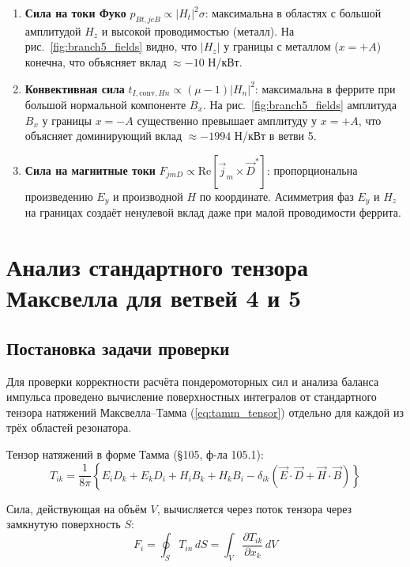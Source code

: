 \documentclass[a4paper,12pt]{article}
\begin{document}
\begin{enumerate}
    \item \textbf{Сила на токи Фуко} $p_{Bt,jeB} \propto |H_t|^2 \sigma$:
    максимальна в областях с большой амплитудой $H_z$ и высокой проводимостью
    (металл). На рис.~\ref{fig:branch5_fields} видно, что $|H_z|$ у границы
    с металлом ($x = +A$) конечна, что объясняет вклад $\approx -10$ Н/кВт.

    \item \textbf{Конвективная сила} $t_{I,\text{conv},Hn} \propto (\mu-1) |H_n|^2$:
    максимальна в феррите при большой нормальной компоненте $B_x$. На
    рис.~\ref{fig:branch5_fields} амплитуда $B_x$ у границы $x = -A$
    существенно превышает амплитуду у $x = +A$, что объясняет доминирующий
    вклад $\approx -1994$ Н/кВт в ветви 5.

    \item \textbf{Сила на магнитные токи} $F_{jmD} \propto \text{Re}[\vec{j}_m \times \vec{D}^*]$:
    пропорциональна произведению $E_y$ и производной $H$ по координате.
    Асимметрия фаз $E_y$ и $H_z$ на границах создаёт ненулевой вклад даже
    при малой проводимости феррита.
\end{enumerate}




\section{Анализ стандартного тензора Максвелла для ветвей 4 и 5}

\subsection{Постановка задачи проверки}

Для проверки корректности расчёта пондеромоторных сил и анализа баланса импульса
проведено вычисление поверхностных интегралов от стандартного тензора натяжений
Максвелла--Тамма (\ref{eq:tamm_tensor}) отдельно для каждой из трёх областей
резонатора.

Тензор натяжений в форме Тамма (\S 105, ф-ла 105.1):
\begin{equation}
T_{ik} = \frac{1}{8\pi}\left\{
E_i D_k + E_k D_i + H_i B_k + H_k B_i -
\delta_{ik}(\vec{E}\cdot\vec{D} + \vec{H}\cdot\vec{B})
\right\}
\label{eq:maxwell_tamm_standard}
\end{equation}

Сила, действующая на объём $V$, вычисляется через поток тензора через
замкнутую поверхность $S$:
\begin{equation}
F_i = \oint_S T_{in}\,dS = \int_V \frac{\partial T_{ik}}{\partial x_k}\,dV
\label{eq:surface_integral}
\end{equation}
\end{document}
